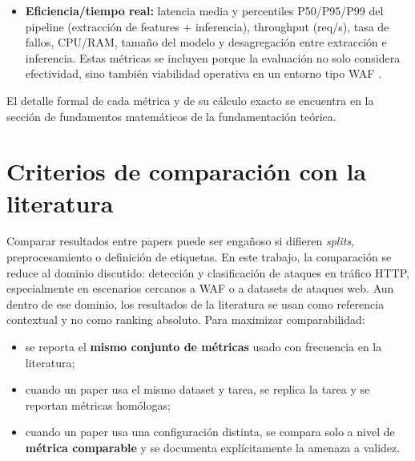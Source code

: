 \documentclass[12pt,oneside]{report}
\begin{document}
\begin{itemize}[leftmargin=*]
  \item \textbf{Eficiencia/tiempo real:} latencia media y percentiles P50/P95/P99 del pipeline (extracción de features + inferencia), throughput (req/s), tasa de fallos, CPU/RAM, tamaño del modelo y desagregación entre extracción e inferencia. Estas métricas se incluyen porque la evaluación no solo considera efectividad, sino también viabilidad operativa en un entorno tipo WAF \cite{ocswaf_zenodo}.
\end{itemize}

El detalle formal de cada métrica y de su cálculo exacto se encuentra en la sección de fundamentos matemáticos de la fundamentación teórica.

\section{Criterios de comparación con la literatura}
Comparar resultados entre papers puede ser engañoso si difieren \textit{splits}, preprocesamiento o definición de etiquetas. En este trabajo, la comparación se reduce al dominio discutido: detección y clasificación de ataques en tráfico HTTP, especialmente en escenarios cercanos a WAF o a datasets de ataques web. Aun dentro de ese dominio, los resultados de la literatura se usan como referencia contextual y no como ranking absoluto. Para maximizar comparabilidad:
\begin{itemize}[leftmargin=*]
  \item se reporta el \textbf{mismo conjunto de métricas} usado con frecuencia en la literatura;
  \item cuando un paper usa el mismo dataset y tarea, se replica la tarea y se reportan métricas homólogas;
  \item cuando un paper usa una configuración distinta, se compara solo a nivel de \textbf{métrica comparable} y se documenta explícitamente la amenaza a validez.
\end{itemize}
\end{document}
